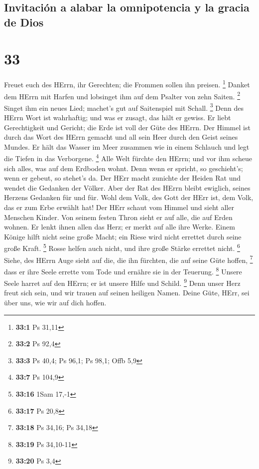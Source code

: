 \hypertarget{invitaciuxf3n-a-alabar-la-omnipotencia-y-la-gracia-de-dios}{%
\subsection{Invitación a alabar la omnipotencia y la gracia de
Dios}\label{invitaciuxf3n-a-alabar-la-omnipotencia-y-la-gracia-de-dios}}

\hypertarget{section-32}{%
\section{33}\label{section-32}}

 Freuet euch des HErrn, ihr Gerechten; die Frommen sollen
ihn preisen. \footnote{\textbf{33:1} Ps 31,11}  Danket dem
HErrn mit Harfen und lobsinget ihm auf dem Psalter von zehn Saiten.
\footnote{\textbf{33:2} Ps 92,4}  Singet ihm ein neues
Lied; machet's gut auf Saitenspiel mit Schall. \footnote{\textbf{33:3}
  Ps 40,4; Ps 96,1; Ps 98,1; Offb 5,9}  Denn des HErrn
Wort ist wahrhaftig; und was er zusagt, das hält er gewiss.
 Er liebt Gerechtigkeit und Gericht; die Erde ist voll der
Güte des HErrn.  Der Himmel ist durch das Wort des HErrn
gemacht und all sein Heer durch den Geist seines Mundes. 
Er hält das Wasser im Meer zusammen wie in einem Schlauch und legt die
Tiefen in das Verborgene. \footnote{\textbf{33:7} Ps 104,9}
 Alle Welt fürchte den HErrn; und vor ihm scheue sich
alles, was auf dem Erdboden wohnt.  Denn wenn er spricht,
so geschieht's; wenn er gebeut, so stehet's da.  Der HErr
macht zunichte der Heiden Rat und wendet die Gedanken der Völker.
 Aber der Rat des HErrn bleibt ewiglich, seines Herzens
Gedanken für und für.  Wohl dem Volk, des Gott der HErr
ist, dem Volk, das er zum Erbe erwählt hat!  Der HErr
schaut vom Himmel und sieht aller Menschen Kinder.  Von
seinem festen Thron sieht er auf alle, die auf Erden wohnen.
 Er lenkt ihnen allen das Herz; er merkt auf alle ihre
Werke.  Einem Könige hilft nicht seine große Macht; ein
Riese wird nicht errettet durch seine große Kraft. \footnote{\textbf{33:16}
  1Sam 17,-1}  Rosse helfen auch nicht, und ihre große
Stärke errettet nicht. \footnote{\textbf{33:17} Ps 20,8} 
Siehe, des HErrn Auge sieht auf die, die ihn fürchten, die auf seine
Güte hoffen, \footnote{\textbf{33:18} Ps 34,16; Ps 34,18}
 dass er ihre Seele errette vom Tode und ernähre sie in
der Teuerung. \footnote{\textbf{33:19} Ps 34,10-11} 
Unsere Seele harret auf den HErrn; er ist unsere Hilfe und Schild.
\footnote{\textbf{33:20} Ps 3,4}  Denn unser Herz freut
sich sein, und wir trauen auf seinen heiligen Namen. 
Deine Güte, HErr, sei über uns, wie wir auf dich hoffen.

